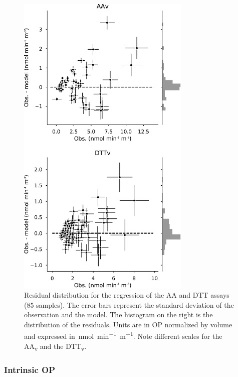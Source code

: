 \documentclass[acp, manuscript]{copernicus}
\begin{document}
\begin{figure}[h]
    \centering
    \includegraphics[width=8.3cm]{figures/fig05_v}
    \caption{Residual distribution for the regression of the AA and DTT assays
        (85 samples). The error bars represent the standard deviation of the
        observation and the model. The histogram on the right is the
        distribution of the residuals. Units are in OP normalized by volume and
        expressed in~\unit{nmol~min^{-1}~m^{-1}}. Note different scales for the
    AA\textsubscript{v} and the DTT\textsubscript{v}.}
    \label{fig:residual}
\end{figure}

\subsubsection{Intrinsic OP}\label{intrinsic-op}
\end{document}
